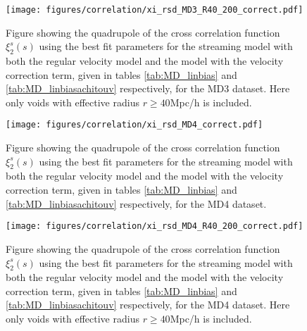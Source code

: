 \begin{figure}[H]
    \texttt{[image: figures/correlation/xi\_rsd\_MD3\_R40\_200\_correct.pdf]}
    \caption{Figure showing the quadrupole of the cross correlation function $\xi_2^s(s)$ using the best fit parameters for the streaming model with both the regular velocity model and the model with the velocity correction term, given in tables \ref{tab:MD_linbias} and \ref{tab:MD_linbiasachitouv} respectively, for the MD3 dataset. Here only voids with effective radius $r\geq 40$Mpc/h is included.}
    \label{fig:xiMD3R40}
\end{figure}

\begin{figure}[H]
    \texttt{[image: figures/correlation/xi\_rsd\_MD4\_correct.pdf]}
    \caption{Figure showing the quadrupole of the cross correlation function $\xi_2^s(s)$ using the best fit parameters for the streaming model with both the regular velocity model and the model with the velocity correction term, given in tables \ref{tab:MD_linbias} and \ref{tab:MD_linbiasachitouv} respectively, for the MD4 dataset.}
    \label{fig:xiMD4}
\end{figure}

\begin{figure}[H]
    \texttt{[image: figures/correlation/xi\_rsd\_MD4\_R40\_200\_correct.pdf]}
    \caption{Figure showing the quadrupole of the cross correlation function $\xi_2^s(s)$ using the best fit parameters for the streaming model with both the regular velocity model and the model with the velocity correction term, given in tables \ref{tab:MD_linbias} and \ref{tab:MD_linbiasachitouv} respectively, for the MD4 dataset. Here only voids with effective radius $r\geq 40$Mpc/h is included.}
    \label{fig:xiMD4R40}
\end{figure}

